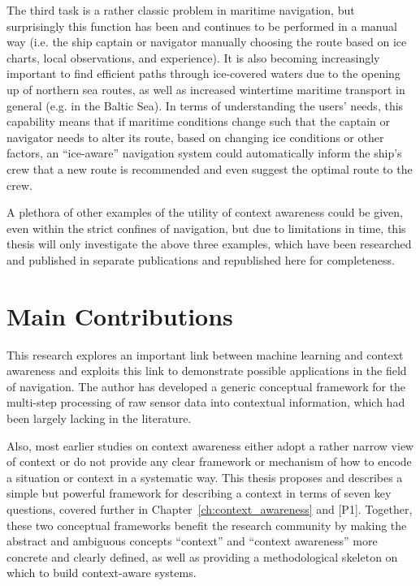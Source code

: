 The third task is a rather classic problem in maritime navigation, but surprisingly this function has been and continues to be performed in a manual way (i.e. the ship captain or navigator manually choosing the route based on ice charts, local observations, and experience). It is also becoming increasingly important to find efficient paths through ice-covered waters due to the opening up of northern sea routes, as well as increased wintertime maritime transport in general (e.g. in the Baltic Sea). In terms of understanding the users' needs, this capability means that if maritime conditions change such that the captain or navigator needs to alter its route, based on changing ice conditions or other factors, an ``ice-aware'' navigation system could automatically inform the ship's crew that a new route is recommended and even suggest the optimal route to the crew.

A plethora of other examples of the utility of context awareness could be given, even within the strict confines of navigation, but due to limitations in time, this thesis will only investigate the above three examples, which have been researched and published in separate publications and republished here for completeness.

\section{Main Contributions}
\label{sec:contributions}

This research explores an important link between machine learning and context awareness and exploits this link to demonstrate possible applications in the field of navigation. The author has developed a generic conceptual framework for the multi-step processing of raw sensor data into contextual information, which had been largely lacking in the literature. 

Also, most earlier studies on context awareness either adopt a rather narrow view of context or do not provide any clear framework or mechanism of how to encode a situation or context in a systematic way. This thesis proposes and describes a simple but powerful framework for describing a context in terms of seven key questions, covered further in Chapter~\ref{ch:context_awareness} and [P1]. Together, these two conceptual frameworks benefit the research community by making the abstract and ambiguous concepts ``context'' and ``context awareness'' more concrete and clearly defined, as well as providing a methodological skeleton on which to build context-aware systems.

